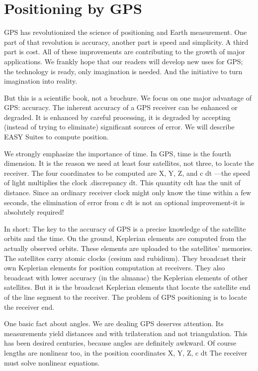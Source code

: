 \section{Positioning by GPS}
GPS has revolutionized the science of positioning and Earth measurement. One part of that revolution is accuracy, another part is speed and simplicity. A third part is cost. All of these improvements are contributing to the growth of major applications. We frankly hope that our readers will develop new uses for GPS; the technology is ready, only imagination is needed. And the initiative to turn imagination into reality.

But this is a scientific book, not a brochure. We focus on one major advantage of GPS: accuracy. The inherent accuracy of a GPS receiver can be enhanced or degraded. It is enhanced by careful processing, it is degraded by accepting (instead of trying to eliminate) significant sources of error. We will describe EASY Suites to compute position.

We strongly emphasize the importance of time. In GPS, time is the fourth dimension. It is the reason we need at least four satellites, not three, to locate the receiver. The four coordinates to be computed are X, Y, Z, and c dt ---the speed of light multiplies the clock .discrepancy dt. This quantity cdt has the unit of distance. Since an ordinary receiver clock might only know the time within a few seconds, the elimination of error from c dt is not an optional improvement-it is absolutely required!

In short: The key to the accuracy of GPS is a precise knowledge of the satellite orbits and the time. On the ground, Keplerian elements are computed from the actually observed orbits. These elements are uploaded to the satellites' memories. The satellites carry atomic clocks (cesium and rubidium). They broadcast their own Keplerian elements for position computation at receivers. They also broadcast with lower accuracy (in the almanac) the Keplerian elements of other satellites. But it is the broadcast Keplerian elements that locate the satellite end of the line segment to the receiver. The problem of GPS positioning is to locate the receiver end.

One basic fact about angles. We are dealing GPS deserves attention. Its measurements yield distances and with trilateration and not triangulation. This has been desired centuries, because angles are definitely awkward. Of course lengths are nonlinear too, in the position coordinates X, Y, Z, c dt The receiver must solve nonlinear equations.

